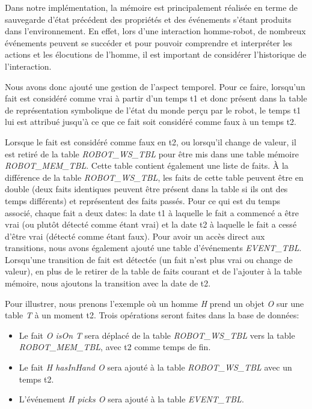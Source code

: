 \documentclass[a4paper,11pt,twoside]{StyleThese}
\begin{document}
Dans notre implémentation, la mémoire est principalement réalisée en terme de sauvegarde d'état précédent des propriétés et des événements s'étant produits dans l'environnement.
En effet, lors d'une interaction homme-robot, de nombreux événements peuvent se succéder et pour pouvoir comprendre et interpréter les actions et les élocutions de l'homme, il est important de considérer l'historique de l'interaction.

Nous avons donc ajouté une gestion de l'aspect temporel.
Pour ce faire, lorsqu'un fait est considéré comme vrai à partir d'un temps t1 et donc présent dans la table de représentation symbolique de l'état du monde perçu par le robot, le temps t1 lui est attribué jusqu'à ce que ce fait soit considéré comme faux à un temps t2.

Lorsque le fait est considéré comme faux en t2, ou lorsqu'il change de valeur, il est retiré de la table \textit{ROBOT\_WS\_TBL} pour être mis dans une table mémoire \textit{ROBOT\_MEM\_TBL}. Cette table contient également une liste de faits. À la différence de la table \textit{ROBOT\_WS\_TBL}, les faits de cette table peuvent être en double (deux faits identiques peuvent être présent dans la table si ils ont des temps différents) et représentent des faits passés. Pour ce qui est du temps associé, chaque fait a deux dates: la date t1 à laquelle le fait a commencé a être vrai (ou plutôt détecté comme étant vrai) et la date t2 à laquelle le fait a cessé d'être vrai (détecté comme étant faux).
Pour avoir un accès direct aux transitions, nous avons également ajouté une table d'événements \textit{EVENT\_TBL}. Lorsqu'une transition de fait est détectée (un fait n'est plus vrai ou change de valeur), en plus de le retirer de la table de faits courant et de l'ajouter à la table mémoire, nous ajoutons la transition avec la date de t2. 

Pour illustrer, nous prenons l'exemple où un homme \textit{H} prend un objet \textit{O} sur une table \textit{T} à un moment t2. Trois opérations seront faites dans la base de données:

\begin{itemize}
\item Le fait \textit{O isOn T} sera déplacé de la table \textit{ROBOT\_WS\_TBL} vers la table \textit{ROBOT\_MEM\_TBL}, avec t2 comme temps de fin.
\item Le fait  \textit{H hasInHand O} sera ajouté à la table \textit{ROBOT\_WS\_TBL} avec un temps t2.
\item L'événement \textit{H picks O} sera ajouté à la table \textit{EVENT\_TBL}.
\end{itemize}
\end{document}
